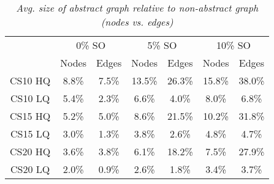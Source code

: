 \begin{table}[ht]
\begin{center}
\caption{\small{\emph{Avg. size of abstract graph relative to non-abstract graph (nodes vs. edges)}}}
\label{aha-table:graphsize}
\begin{tabular*}{0.49\textwidth}{@{\extracolsep{\fill}}ccccccc}%
  \hline
 & \multicolumn{2}{c}{\small{0\% SO}} & \multicolumn{2}{c}{\small{5\% SO}} & \multicolumn{2}{c}{\small{10\% SO}} \\
 & \small{Nodes} & \small{Edges} & \small{Nodes} & \small{Edges} & \small{Nodes} & \small{Edges} \\
  \hline
  \small{CS10 HQ} & \small{8.8\%} & \small{7.5\%} & \small{13.5\%} & \small{26.3\%} & \small{15.8\%} & \small{38.0\%} \\
  \small{CS10 LQ} & \small{5.4\%} & \small{2.3\%} & \small{6.6\%}  & \small{4.0\%}  & \small{8.0\%}  & \small{6.8\%} \\
  \small{CS15 HQ} & \small{5.2\%} & \small{5.0\%} & \small{8.6\%}  & \small{21.5\%} & \small{10.2\%}  & \small{31.8\%} \\
  \small{CS15 LQ} & \small{3.0\%} & \small{1.3\%} & \small{3.8\%}  & \small{2.6\%}  & \small{4.8\%}  & \small{4.7\%} \\
  \small{CS20 HQ} & \small{3.6\%} & \small{3.8\%} & \small{6.1\%}  & \small{18.2\%} & \small{7.5\%}  & \small{27.9\%} \\
  \small{CS20 LQ} & \small{2.0\%} & \small{0.9\%} & \small{2.6\%}  & \small{1.8\%}  & \small{3.4\%}  & \small{3.7\%} \\
   \hline
\end{tabular*}
\end{center}
\end{table}
